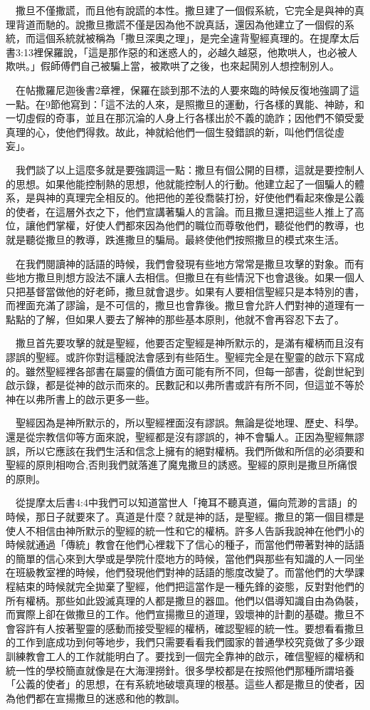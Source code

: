 \documentclass{book}
\begin{document}
　撒旦不僅撒謊，而且他有說謊的本性。撒旦建了一個假系統，它完全是與神的真理背道而馳的。說撒旦撒謊不僅是因為他不說真話，還因為他建立了一個假的系統，而這個系統就被稱為「撒旦深奧之理」，是完全違背聖經真理的。在提摩太后書3:13裡保羅說，「這是那作惡的和迷惑人的，必越久越惡，他欺哄人，也必被人欺哄。」假師傅們自己被騙上當，被欺哄了之後，也來起鬨別人想控制別人。

　在帖撒羅尼迦後書2章裡，保羅在談到那不法的人要來臨的時候反復地強調了這一點。在9節他寫到：「這不法的人來，是照撒旦的運動，行各樣的異能、神跡，和一切虛假的奇事，並且在那沉淪的人身上行各樣出於不義的詭詐；因他們不領受愛真理的心，使他們得救。故此，神就給他們一個生發錯誤的新，叫他們信從虛妄」。

　我們談了以上這麼多就是要強調這一點：撒旦有個公開的目標，這就是要控制人的思想。如果他能控制熱的思想，他就能控制人的行動。他建立起了一個騙人的體系，是與神的真理完全相反的。他把他的差役喬裝打扮，好使他們看起來像是公義的使者，在這層外衣之下，他們宣講著騙人的言論。而且撒旦還把這些人推上了高位，讓他們掌權，好使人們都來因為他們的職位而尊敬他們，聽從他們的教導，也就是聽從撒旦的教導，跌進撒旦的騙局。最終使他們按照撒旦的模式來生活。

　在我們閱讀神的話語的時候，我們會發現有些地方常常是撒旦攻擊的對象。而有些地方撒旦則想方設法不讓人去相信。但撒旦在有些情況下也會退後。如果一個人只把基督當做他的好老師，撒旦就會退步。如果有人要相信聖經只是本特別的書，而裡面充滿了謬論，是不可信的，撒旦也會靠後。撒旦會允許人們對神的道理有一點點的了解，但如果人要去了解神的那些基本原則，他就不會再容忍下去了。

　撒旦首先要攻擊的就是聖經，他要否定聖經是神所默示的，是滿有權柄而且沒有謬誤的聖經。或許你對這種說法會感到有些陌生。聖經完全是在聖靈的啟示下寫成的。雖然聖經裡各部書在屬靈的價值方面可能有所不同，但每一部書，從創世紀到啟示錄，都是從神的啟示而來的。民數記和以弗所書或許有所不同，但這並不等於神在以弗所書上的啟示更多一些。

　聖經因為是神所默示的，所以聖經裡面沒有謬誤。無論是從地理、歷史、科學。還是從宗教信仰等方面來說，聖經都是沒有謬誤的，神不會騙人。正因為聖經無謬誤，所以它應該在我們生活和信念上擁有的絕對權柄。我們所做和所信的必須要和聖經的原則相吻合,否則我們就落進了魔鬼撒旦的誘惑。聖經的原則是撒旦所痛恨的原則。

　從提摩太后書4:4中我們可以知道當世人「掩耳不聽真道，偏向荒渺的言語」的時候，那日子就要來了。真道是什麼？就是神的話，是聖經。撒旦的第一個目標是使人不相信由神所默示的聖經的統一性和它的權柄。許多人告訴我說神在他們小的時候就通過「傳統」教會在他們心裡栽下了信心的種子，而當他們帶著對神的話語的簡單的信心來到大學或是學院什麼地方的時候，當他們與那些有知識的人一同坐在班級教室裡的時候，他們發現他們對神的話語的態度改變了。而當他們的大學課程結束的時候就完全拋棄了聖經，他們把這當作是一種先鋒的姿態，反對對他們的所有權柄。那些如此毀滅真理的人都是撒旦的器皿。他們以倡導知識自由為偽裝，而實際上卻在做撒旦的工作。他們宣揚撒旦的道理，毀壞神的計劃的基礎。撒旦不會容許有人按著聖靈的感動而接受聖經的權柄，確認聖經的統一性。要想看看撒旦的工作到底成功到何等地步，我們只需要看看我們國家的普通學校究竟做了多少跟訓練教會工人的工作就能明白了。要找到一個完全靠神的啟示，確信聖經的權柄和統一性的學校簡直就像是在大海浬撈針。很多學校都是在按照他們那種所謂培養「公義的使者」的思想，在有系統地破壞真理的根基。這些人都是撒旦的使者，因為他們都在宣揚撒旦的迷惑和他的教訓。
\end{document}
